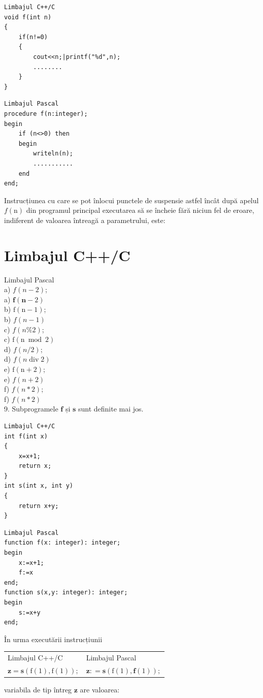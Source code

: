 \documentclass[10pt]{article}
\begin{document}
\begin{verbatim}
Limbajul C++/C
void f(int n)
{
    if(n!=0)
    {
        cout<<n;|printf("%d",n);
        ........
    }
}
\end{verbatim}

\begin{verbatim}
Limbajul Pascal
procedure f(n:integer);
begin
    if (n<>0) then
    begin
        writeln(n);
        ...........
    end
end;
\end{verbatim}

Instrucțiunea cu care se pot înlocui punctele de suspensie astfel încât după apelul $f(\mathrm{n})$ din programul principal executarea să se încheie fără niciun fel de eroare, indiferent de valoarea întreagă a parametrului, este:

\section*{Limbajul C++/C}
Limbajul Pascal\\
a) $f(n-2)$;\\
a) $\mathbf{f}(\mathbf{n}-2)$\\
b) $\mathrm{f}(\mathrm{n}-1)$;\\
b) $f(n-1)$\\
c) $f(n \% 2)$;\\
c) $\mathrm{f}(\mathrm{n} \bmod 2)$\\
d) $f(n / 2)$;\\
d) $f(n \operatorname{div} 2)$\\
e) $\mathrm{f}(\mathrm{n}+2)$;\\
e) $f(n+2)$\\
f) $f(n * 2)$;\\
f) $f(n * 2)$\\
9. Subprogramele $\mathbf{f}$ și $\mathbf{s}$ sunt definite mai jos.

\begin{verbatim}
Limbajul C++/C
int f(int x)
{
    x=x+1;
    return x;
}
int s(int x, int y)
{
    return x+y;
}
\end{verbatim}

\begin{verbatim}
Limbajul Pascal
function f(x: integer): integer;
begin
    x:=x+1;
    f:=x
end;
function s(x,y: integer): integer;
begin
    s:=x+y
end;
\end{verbatim}

În urma executării instrucțiunii

\begin{center}
\begin{tabular}{l|l}
Limbajul C++/C & Limbajul Pascal \\
$\mathbf{z = s}(\mathrm{f}(1), \mathrm{f}(1)) ;$ & $\mathbf{z : = s}(\mathrm{f}(1), \mathbf{f}(1)) ;$ \\
\end{tabular}
\end{center} variabila de tip întreg $\mathbf{z}$ are valoarea:
\end{document}
